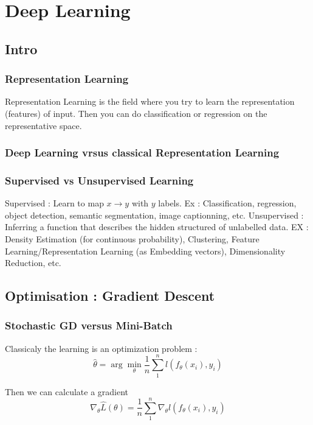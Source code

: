 \chapter{Deep Learning} %
\label{cha:deep_learning}

\section{Intro}
	\subsection{Representation Learning}

		Representation Learning is the field where you try to learn the representation (features) of input. Then you can do classification or regression on the representative space.

	\subsection{Deep Learning vrsus classical Representation Learning}


	\subsection{Supervised vs Unsupervised Learning}
		Supervised : Learn to map $x \rightarrow y$ with $y$ labels. Ex : Classification, regression, object detection, semantic segmentation, image captionning, etc.
		Unsupervised : Inferring a function that describes the hidden structured of unlabelled data. EX : Density Estimation (for continuous probability), Clustering, Feature Learning/Representation Learning (as Embedding vectors), Dimensionality Reduction, etc.

\section{Optimisation : Gradient Descent}
	\subsection{Stochastic GD versus Mini-Batch}

		Classicaly the learning is an optimization problem : 
		\[
			\hat \theta = \arg \min_\theta \frac{1}{n}\sum^n_1 l(f_\theta(x_i), y_i)
		\]

		Then we can calculate a gradient
		\[
			\nabla_\theta \hat L (\theta) = \frac{1}{n}	\sum^n_1 \nabla_\theta l(f_\theta(x_i), y_i)
		\]

